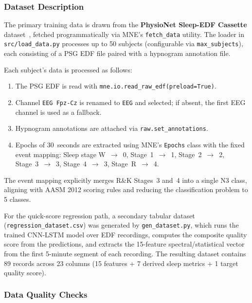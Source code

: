 \documentclass[10pt]{article}
\begin{document}
\subsubsection{Dataset Description}
\label{sec:datasetDescription}

The primary training data is drawn from the \textbf{PhysioNet Sleep-EDF Cassette} dataset~\cite{kemp2000analysis,goldberger2000physiobank}, fetched programmatically via MNE's \texttt{fetch\_data} utility. The loader in \texttt{src/load\_data.py} processes up to 50 subjects (configurable via \texttt{max\_subjects}), each consisting of a PSG EDF file paired with a hypnogram annotation file.

Each subject's data is processed as follows:
\begin{enumerate}
  \item The PSG EDF is read with \texttt{mne.io.read\_raw\_edf(preload=True)}.
  \item Channel \texttt{EEG Fpz-Cz} is renamed to \texttt{EEG} and selected; if absent, the first EEG channel is used as a fallback.
  \item Hypnogram annotations are attached via \texttt{raw.set\_annotations}.
  \item Epochs of 30~seconds are extracted using MNE's \texttt{Epochs} class with the fixed event mapping: Sleep stage W~$\rightarrow$~0, Stage~1~$\rightarrow$~1, Stage~2~$\rightarrow$~2, Stage~3~$\rightarrow$~3, Stage~4~$\rightarrow$~3, Stage~R~$\rightarrow$~4.
\end{enumerate}

The event mapping explicitly merges R\&K Stages~3 and~4 into a single N3 class, aligning with AASM 2012 scoring rules and reducing the classification problem to 5 classes.

For the quick-score regression path, a secondary tabular dataset (\texttt{regression\_dataset.csv}) was generated by \texttt{gen\_dataset.py}, which runs the trained CNN-LSTM model over EDF recordings, computes the composite quality score from the predictions, and extracts the 15-feature spectral/statistical vector from the first 5-minute segment of each recording. The resulting dataset contains 89 records across 23 columns (15 features + 7 derived sleep metrics + 1 target quality score).

\subsubsection{Data Quality Checks}
\label{sec:dataQualityChecks}
\end{document}

